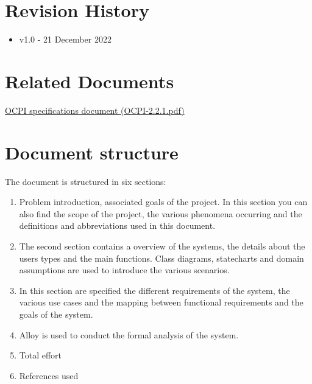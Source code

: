 \section{Revision History}
\begin{itemize}
	\item v1.0 - 21 December 2022
\end{itemize}

\section{Related Documents}
\href{../Specs/OCPI-2.2.1.pdf}{OCPI specifications document (OCPI-2.2.1.pdf)}

\section{Document structure}
The document is structured in six sections:

\begin{enumerate}
	\item Problem introduction, associated goals of the project. In this section you can also find the scope of the project, the various phenomena occurring and the definitions and abbreviations used in this document.
	\item The second section contains a overview of the systems, the details about the users types and the main functions. Class diagrams, statecharts and domain assumptions are used to introduce the various scenarios.
	\item In this section are specified the different requirements of the system, the various use cases and the mapping between functional requirements and the goals of the system.
	\item Alloy is used to conduct the formal analysis of the system.
	\item Total effort
	\item References used
\end{enumerate}






















